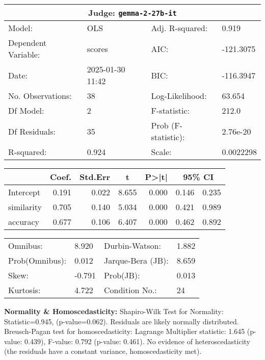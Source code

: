 \begin{center}
\small
\begin{tabular}{llll}
\toprule
\multicolumn{4}{c}{\textbf{Judge:} \texttt{gemma-2-27b-it} \citep{gemmateam2024gemma2improvingopen}} \\
\midrule
Model: & OLS & Adj. R-squared: & 0.919 \\
Dependent Variable: & scores & AIC: & -121.3075 \\
Date: & 2025-01-30 11:42 & BIC: & -116.3947 \\
No. Observations: & 38 & Log-Likelihood: & 63.654 \\
Df Model: & 2 & F-statistic: & 212.0 \\
Df Residuals: & 35 & Prob (F-statistic): & 2.76e-20 \\
R-squared: & 0.924 & Scale: & 0.0022298 \\
\bottomrule
\end{tabular}

\vspace{5pt}
\begin{tabular}{lrrrrrr}
\toprule
 & \multicolumn{1}{c}{Coef.} & \multicolumn{1}{c}{Std.Err} & \multicolumn{1}{c}{t} & \multicolumn{1}{c}{P>|t|} & \multicolumn{2}{c}{95\% CI} \\
\midrule
Intercept & 0.191 & 0.022 & 8.655 & 0.000 & 0.146 & 0.235 \\
similarity & 0.705 & 0.140 & 5.034 & 0.000 & 0.421 & 0.989 \\
accuracy & 0.677 & 0.106 & 6.407 & 0.000 & 0.462 & 0.892 \\
\bottomrule
\end{tabular}

\vspace{5pt}
\begin{tabular}{@{}ll@{\hspace{15pt}}ll@{}}
\toprule
Omnibus: & 8.920 & Durbin-Watson: & 1.882 \\
Prob(Omnibus): & 0.012 & Jarque-Bera (JB): & 8.659 \\
Skew: & -0.791 & Prob(JB): & 0.013 \\
Kurtosis: & 4.722 & Condition No.: & 24 \\
\bottomrule
\end{tabular}
\end{center}

\textbf{Normality \& Homoscedasticity:} Shapiro-Wilk Test for Normality: Statistic=0.945, (p-value=0.062).
Residuals are likely normally distributed.
Breusch-Pagan test for homoscedasticity:
Lagrange Multiplier statistic: 1.645
(p-value: 0.439), 
F-value: 0.792
(p-value: 0.461). 
No evidence of heteroscedasticity (the residuals have a constant variance, homoscedasticity met).

